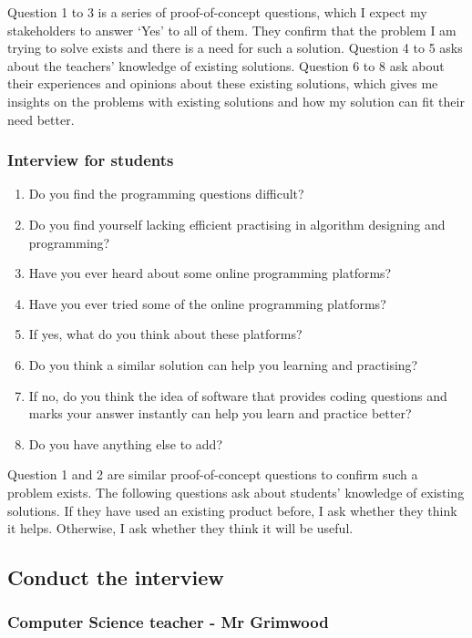 \documentclass[a4paper]{report}
\begin{document}
Question 1 to 3 is a series of proof-of-concept questions, which I expect my stakeholders to answer `Yes' to all of them. They confirm that the problem I am trying to solve exists and there is a need for such a solution. Question 4 to 5 asks about the teachers' knowledge of existing solutions. Question 6 to 8 ask about their experiences and opinions about these existing solutions, which gives me insights on the problems with existing solutions and how my solution can fit their need better.

\subsubsection{Interview for students}

\begin{enumerate}
    \item Do you find the programming questions difficult?
    \item Do you find yourself lacking efficient practising in algorithm designing and programming?
    \item Have you ever heard about some online programming platforms?
    \item Have you ever tried some of the online programming platforms?
    \item If yes, what do you think about these platforms?
    \item Do you think a similar solution can help you learning and practising?
    \item If no, do you think the idea of software that provides coding questions and marks your answer instantly can help you learn and practice better?
    \item Do you have anything else to add?
\end{enumerate}

Question 1 and 2 are similar proof-of-concept questions to confirm such a problem exists. The following questions ask about students' knowledge of existing solutions. If they have used an existing product before, I ask whether they think it helps. Otherwise, I ask whether they think it will be useful.

\subsection{Conduct the interview}

\subsubsection{Computer Science teacher - Mr Grimwood}
\end{document}

